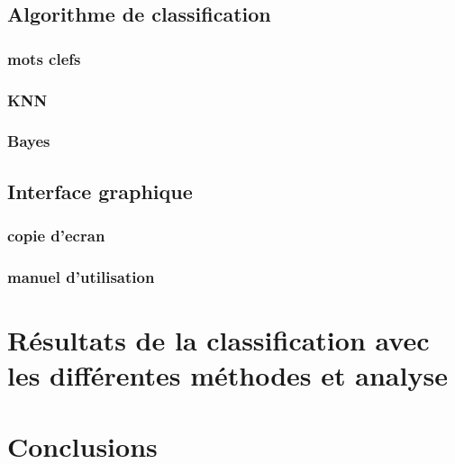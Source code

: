 \documentclass[a4paper,10pt]{report}
\begin{document}
  \section{Algorithme de classification}
    \subsection{mots clefs}
    \subsection{KNN}
    \subsection{Bayes}
  \section{Interface graphique}
    \subsection{copie d'ecran}
    \subsection{manuel d'utilisation}
\chapter{Résultats de la classification avec les différentes méthodes et analyse}
\chapter{Conclusions}
\end{document}
